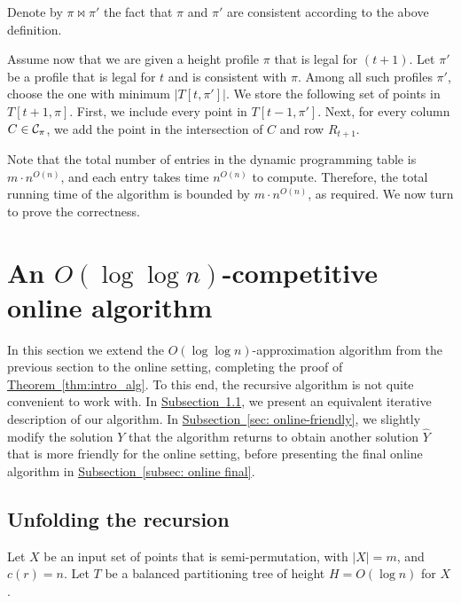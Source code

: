 \documentclass[11pt]{article}
\numberwithin{equation}{section}
\theoremstyle{definition}
\theoremstyle{plain}
\newcommand{\expref}[2]{\hyperref[#2]{#1~\ref{#2}}}
\begin{document}
Denote by $\pi \bowtie \pi'$ the fact that $\pi$ and $\pi'$ are consistent according to the above definition. 


Assume now that we are given a height profile $\pi$ that is legal for $(t+1)$. 
Let $\pi'$ be a profile that is legal for $t$ and is consistent with $\pi$. Among all such profiles $\pi'$, choose the one with minimum $|T[t,\pi']|$. We store the following set of points in $T[t+1,\pi]$. First, we include every point in $T[t-1,\pi']$. Next, for every column $C\in {\mathcal C}_{\pi}$, we add the point in the intersection of $C$ and row $R_{t+1}$.

Note that the total number of entries in the dynamic programming table is $m\cdot n^{O(n)}$, and each entry takes time $n^{O(n)}$ to compute. Therefore, the total running time of the algorithm is bounded by $m\cdot n^{O(n)}$, as required. We now turn to prove the correctness.
\fi


%

\newcommand{\first}{{\sf first}} 

\newcommand{\last}{{\sf last}} 


\newcommand{\proj}{{\sf proj}} 

\section{An $O(\log \log n)$-competitive online algorithm}  
\label{sec: online}

In this section we extend the $O(\log\log n)$-approximation algorithm from the previous section to the online setting, completing the proof of \expref{Theorem}{thm:intro_alg}. To this end, the recursive algorithm is not quite convenient to work with. In \expref{Subsection}{subsec: unfold}, we present an equivalent iterative description of our algorithm. In \expref{Subsection}{sec: online-friendly}, we slightly modify the solution $Y$ that the algorithm returns to obtain another solution $\hat{Y}$ that is more friendly for the online setting, before presenting the final online algorithm in \expref{Subsection}{subsec: online final}.


\subsection{Unfolding the recursion} 
\label{subsec: unfold}  
 
Let $X$ be an input set of points that is semi-permutation, with $|X|=m$, and $c(r)=n$. Let $T$ be a balanced partitioning tree of height $H=O(\log n)$ for $X$. %
\end{document}

